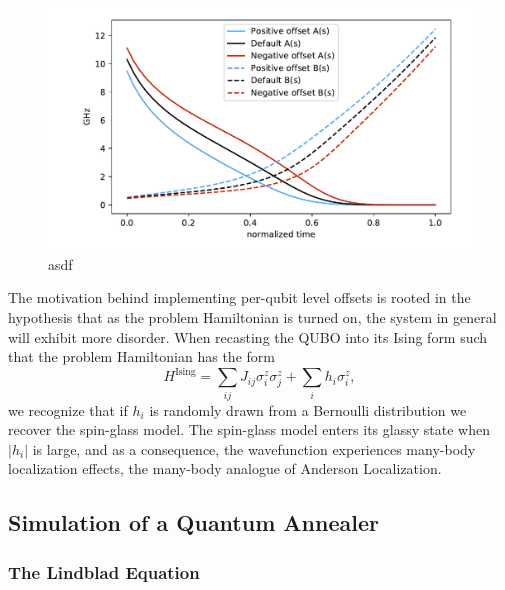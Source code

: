 \documentclass[prd,twocolumn,tightenlines,preprintnumbers,showpacs,superscriptaddress,notitlepage,nofootinbib,eqsecnum,floatfix,longbibliography]{revtex4}
\begin{document}
\begin{figure}[htb]
    \centering
    \includegraphics[width=\columnwidth]{./figures/anneal_schedule.pdf}
    \caption{asdf}
    \label{fig:anneal_schedule}
\end{figure}

The motivation behind implementing per-qubit level offsets is rooted in the hypothesis that as the problem Hamiltonian is turned on, the system in general will exhibit more disorder.
When recasting the QUBO into its Ising form such that the problem Hamiltonian has the form
\begin{equation}
    H^{\textrm{Ising}} = \sum_{ij} J_{ij} \sigma^z_i \sigma^z_j + \sum_i h_i \sigma^z_i,
\end{equation}
we recognize that if $h_i$ is randomly drawn from a Bernoulli distribution we recover the spin-glass model.
The spin-glass model enters its glassy state when $|h_i|$ is large, and as a consequence, the wavefunction experiences many-body localization effects, the many-body analogue of Anderson Localization.


\subsection{Simulation of a Quantum Annealer}
\label{sec:methods:simulation}

\subsubsection{The Lindblad Equation}
\label{sec:methods:lindblad}
\end{document}
